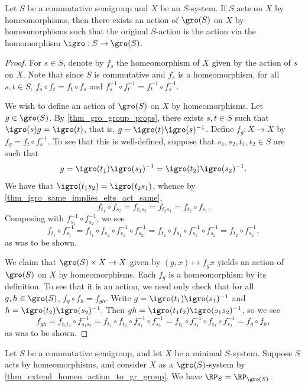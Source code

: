 \begin{theorem}
\label{thm_extend_homeo_action_to_gr_group}
\leanok{}
    Let $S$ be a commutative semigroup and $X$ be an $S$-system.  If $S$ acts on $X$ by homeomorphisms, then there exists an action of $\gro(S)$ on $X$ by homeomorphisms such that the original $S$-action is the action via the homomorphism $\igro: S \to \gro(S)$.
\end{theorem}

\begin{proof}
    For $s \in S$, denote by $f_s$ the homeomorphism of $X$ given by the action of $s$ on $X$. Note that since $S$ is commutative and $f_s$ is a homeomorphism, for all $s, t \in S$, $f_s \circ f_t = f_t \circ f_s$ and $f_s^{-1} \circ f_t^{-1} = f_t^{-1} \circ f_s^{-1}$.
    
    We wish to define an action of $\gro(S)$ on $X$ by homeomorphisms. Let $g \in \gro(S)$. By \cref{thm_gro_group_props}, there exists $s, t \in S$ such that $\igro(s) g = \igro(t)$, that is, $g = \igro(t) \igro(s)^{-1}$. Define $f_g: X \to X$ by $f_g = f_t \circ f_s^{-1}$.  To see that this is well-defined, suppose that $s_1, s_2, t_1, t_2 \in S$ are such that
    \[g = \igro(t_1) \igro(s_1)^{-1} = \igro(t_2) \igro(s_2)^{-1}.\]
    We have that $\igro(t_1 s_2) = \igro(t_2 s_1)$, whence by \cref{thm_igro_same_implies_elts_act_same},
    \[f_{t_1} \circ f_{s_2} = f_{t_1 s_2} = f_{t_2 s_1} = f_{t_2} \circ f_{s_1}.\]
    Composing with $f_{s_1}^{-1} \circ f_{s_2}^{-1}$, we see
    \[f_{t_1} \circ f_{s_1}^{-1} = f_{t_1} \circ f_{s_2} \circ f_{s_1}^{-1} \circ f_{s_2}^{-1} = f_{t_2} \circ f_{s_1} \circ f_{s_1}^{-1} \circ f_{s_2}^{-1} = f_{t_2} \circ f_{s_2}^{-1},\]
    as was to be shown.

    We claim that $\gro(S) \times X \to X$ given by $(g,x) \mapsto f_g x$ yields an action of $\gro(S)$ on $X$ by homeomorphisms.  Each $f_g$ is a homeomorphism by its definition. To see that it is an action, we need only check that for all $g, h \in \gro(S)$, $f_g \circ f_h = f_{gh}$.  Write $g = \igro(t_1) \igro(s_1)^{-1}$ and $h = \igro(t_2) \igro(s_2)^{-1}$.  Then $gh = \igro(t_1 t_2) \igro(s_1 s_2)^{-1}$, so we see
    \[f_{gh} = f_{t_1 t_2} \circ f_{s_1s_2}^{-1} = f_{t_1} \circ f_{t_2} \circ f_{s_1}^{-1} \circ f_{s_2}^{-1} = f_{t_1} \circ f_{s_1}^{-1} \circ f_{t_2} \circ f_{s_2}^{-1} = f_g \circ f_{h},\]
    as was to be shown.
\end{proof}

\begin{corollary}
\label{cor_S_and_GS_actions}
\leanok{}
    Let $S$ be a commutative semigroup, and let $X$ be a minimal $S$-system.  Suppose $S$ acts by homeomorphisms, and consider $X$ as a $\gro(S)$-system by \cref{thm_extend_homeo_action_to_gr_group}. We have $\RP_S = \RP_{\gro(S)}$.
\end{corollary}

